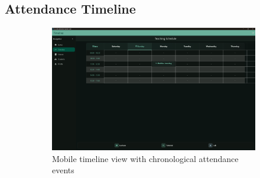 \subsection{Attendance Timeline}\nopagebreak[4]
\vspace{0.5cm}
\begin{figure}[H]
    \centering
    \begin{subfigure}[b]{0.35\textwidth}
        \includegraphics[width=\textwidth]{images/rachid/teacher-side-timeline.png}
        \caption{Mobile timeline view with chronological attendance events}
    \end{subfigure}
    \hfill
    \begin{subfigure}[b]{0.35\textwidth}

\end{subfigure}
\end{figure}
